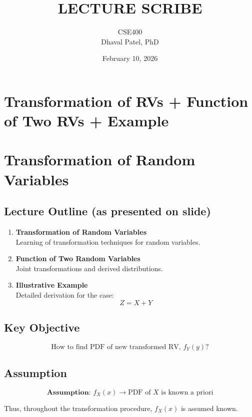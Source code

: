 \documentclass[12pt]{article}
\title{LECTURE SCRIBE}
\author{CSE400 \\ Dhaval Patel, PhD}
\date{February 10, 2026}
\begin{document}
\maketitle

\section*{Transformation of RVs + Function of Two RVs + Example}

\section{Transformation of Random Variables}

\subsection{Lecture Outline (as presented on slide)}

\begin{enumerate}
    \item \textbf{Transformation of Random Variables} \\
    Learning of transformation techniques for random variables.
    
    \item \textbf{Function of Two Random Variables} \\
    Joint transformations and derived distributions.
    
    \item \textbf{Illustrative Example} \\
    Detailed derivation for the case:
    \[
    Z = X + Y
    \]
\end{enumerate}

\subsection{Key Objective}

\[
\boxed{\text{How to find PDF of new transformed RV, } f_Y(y)\text{?}}
\]

\subsection{Assumption}

\[
\textbf{Assumption: } f_X(x) \rightarrow \text{PDF of } X \text{ is known a priori}
\]

Thus, throughout the transformation procedure, \( f_X(x) \) is assumed known.
\end{document}
